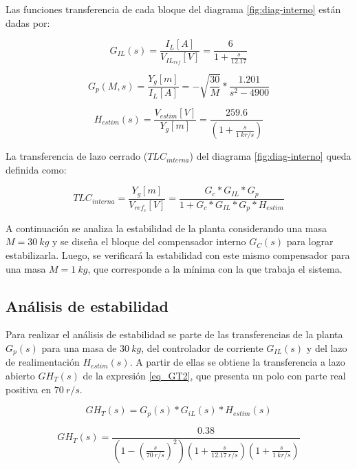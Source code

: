 Las funciones transferencia de cada bloque del diagrama \ref{fig:diag-interno} están dadas por:

\begin{equation*}
	G_{IL}(s) =\frac{I_L[A]}{V_{IL_{ref}}[V]}=\frac{6}{1+\frac{s}{12.17}}
\end{equation*}

\begin{equation*} 
	G_{p}(M,s)=\frac{Y_g[m]}{I_L[A]}=-\sqrt{\frac{30}{M}}*\frac{1.201}{s^{2}-4900}
\end{equation*}

\begin{equation*} 
	H_{estim}(s)=\frac{V_{estim}[V]}{Y_{g}[m]}=\frac{259.6}{(1+\frac{s}{1\:kr/s})}
\end{equation*}

La transferencia de lazo cerrado ($TLC_{interna}$) del diagrama \ref{fig:diag-interno} queda definida como:

\begin{equation}
	TLC_{interna}=\frac{Y_g[m]}{V_{ref_c}[V]}=\frac{G_c*G_{IL}*G_p}{1+G_c*G_{IL}*G_p*H_{estim}}
\end{equation}

A continuación se analiza la estabilidad de la planta considerando una masa $M=30\:kg$ y se diseña el bloque del compensador interno $G_C(s)$ para lograr estabilizarla. Luego, se verificará la estabilidad con este mismo compensador para una masa $M=1\:kg$, que corresponde a la mínima con la que trabaja el sistema.

\subsection{Análisis de estabilidad}

Para realizar el análisis de estabilidad se parte de las transferencias de la planta $G_{p}(s)$ para una masa de $30\:kg$, del controlador de corriente $G_{IL}(s)$ y del lazo de realimentación $H_{estim}(s)$. A partir de ellas se obtiene la transferencia a lazo abierto $GH_T(s)$ de la expresión \ref{eq_GT2}, que presenta un polo con parte real positiva en $70\:r/s$.

\begin{equation*}
	GH_T(s)=G_{p}(s)*G_{iL}(s)*H_{estim}(s) 
\end{equation*}

\begin{equation} \label{eq_GT2}
		GH_T(s)=\frac{0.38}{(1-(\frac{s}{70\:r/s})^2)(1+\frac{s}{12.17\:r/s })(1+\frac{s}{1\:kr/s}) }	
\end{equation}


